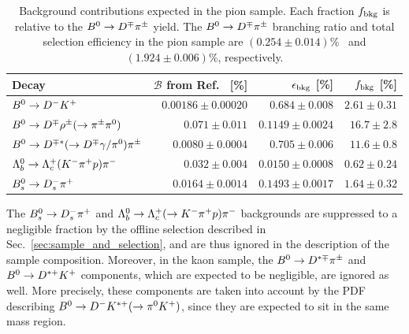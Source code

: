\begin{table}[t]
	\centering
	\begin{tabular}{lrrr}
		\toprule
		Decay & $\mathcal{B}$ from Ref.~\cite{PDG2017} [\%] & $\epsilon_{\rm bkg}$ [\%] & $f_{\rm bkg}$ [\%] \\
		\midrule
		$B^0\rightarrow D^-K^+$ 			  			      & $0.00186\pm0.00020$ & $0.684\pm0.008$   & $2.61\pm0.31$ \\
		$B^0\rightarrow D^\mp\rho^\pm(\rightarrow\pi^\pm\pi^0)$ 			      & $0.071\pm0.011$     & $0.1149\pm0.0024$ & $16.7\pm2.8$  \\
		$B^0\rightarrow D^{\mp*}(\rightarrow D^\mp\gamma/\pi^{0})\pi^\pm$ 	  & $0.0080\pm0.0004$   & $0.705\pm0.006$   & $11.6\pm0.8$  \\
		$\Lambda_{b}^0\rightarrow\Lambda_{c}^{+}(K^-\pi^+ p)\pi^-$ & $0.032\pm0.004$     & $0.0150\pm0.0008$ & $0.62\pm0.24$ \\
		$B^0_s\rightarrow D^-_s\pi^+$ 					  & $0.0164\pm 0.0014$     & $0.1493\pm0.0017$ & $1.64\pm0.32$   \\
		\bottomrule
	\end{tabular}
	\caption{Background contributions expected in the pion sample. Each fraction $f_{\rm bkg}$ is relative to the $B^0\rightarrow D^\mp\pi^\pm$ yield. 
	The $B^0\rightarrow D^\mp\pi^\pm$ branching ratio and total selection efficiency in the pion sample are
	$(0.254 \pm 0.014)\%$~\cite{PDG2017} and $(1.924\pm0.006)\%$, respectively.
	\label{tab:expected-backgrounds}
	}
\end{table}

The $B^0_s\rightarrow D^-_s\pi^+$ and $\Lambda_{b}^0\rightarrow\Lambda_{c}^{+}(\rightarrow K^-\pi^+ p)\pi^-$
backgrounds are suppressed to a negligible fraction by the offline selection
described in Sec.~\ref{sec:sample_and_selection}, and are thus ignored in the
description of the sample composition. Moreover, in the kaon sample, the $B^0\rightarrow
D^{*\mp}\pi^\pm$ and $B^0\rightarrow D^{*+}K^+$ components, which are expected to be negligible,
are ignored as well. More precisely, these components are taken into
account by the PDF describing $B^0\rightarrow D^- K^{*+}(\rightarrow\pi^{0}K^+)$, since they are
expected to sit in the same mass region.

